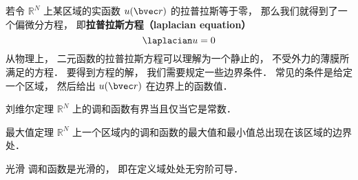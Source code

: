 
\begin{issues}
\issueDraft
\end{issues}


若令 $\mathbb R^N$ 上某区域的实函数 $u(\bvec r)$ 的拉普拉斯等于零， 那么我们就得到了一个偏微分方程， 即\textbf{拉普拉斯方程（laplacian equation）}
\begin{equation}
\laplacian u = 0
\end{equation}
从物理上， 二元函数的拉普拉斯方程可以理解为一个静止的， 不受外力的薄膜所满足的方程． 要得到方程的解， 我们需要规定一些边界条件． 常见的条件是给定一个区域， 然后给出 $u(\bvec r)$ 在边界上的函数值．

\begin{theorem}{刘维尔定理}\label{LapEq_the1}
$\mathbb R^N$ 上的调和函数有界当且仅当它是常数．
\end{theorem}

\begin{theorem}{最大值定理}
$\mathbb R^N$ 上一个区域内的调和函数的最大值和最小值总出现在该区域的边界处．
\end{theorem}

\begin{theorem}{光滑}
调和函数是光滑的， 即在定义域处处无穷阶可导．
\end{theorem}
